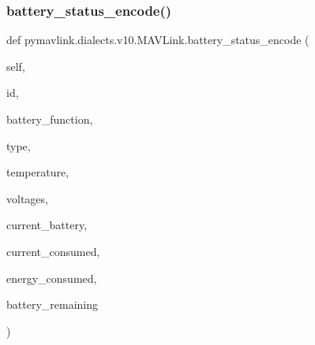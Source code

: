 \subsubsection{\texorpdfstring{battery\+\_\+status\+\_\+encode()}{battery\_status\_encode()}}
{\footnotesize\ttfamily def pymavlink.\+dialects.\+v10.\+M\+A\+V\+Link.\+battery\+\_\+status\+\_\+encode (\begin{DoxyParamCaption}\item[{}]{self,  }\item[{}]{id,  }\item[{}]{battery\+\_\+function,  }\item[{}]{type,  }\item[{}]{temperature,  }\item[{}]{voltages,  }\item[{}]{current\+\_\+battery,  }\item[{}]{current\+\_\+consumed,  }\item[{}]{energy\+\_\+consumed,  }\item[{}]{battery\+\_\+remaining }\end{DoxyParamCaption})}


